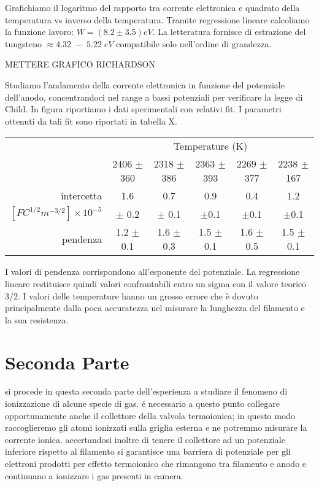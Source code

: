 \documentclass[11pt,a4paper]{article}
\begin{document}
Grafichiamo il logaritmo del rapporto tra corrente elettronica e quadrato della temperatura vs inverso della temperatura. Tramite regressione lineare calcoliamo la funzione lavoro: $W = (8.2 \pm 3.5) eV$. La letteratura fornisce  di estrazione del tungsteno $\approx 4.32 \; - \; 5.22 \; eV$ compatibile solo nell'ordine di grandezza.  

	METTERE GRAFICO RICHARDSON
	
Studiamo l'andamento della corrente elettronica in funzione del potenziale dell'anodo, concentrandoci nel range a bassi potenziali per verificare la legge di Child. In figura riportiamo i dati sperimentali con relativi fit. I parametri ottenuti da tali fit sono riportati in tabella X.

\begin{center}
\begin{tabular}{rccccc}
&\multicolumn{5}{c}{Temperature (K)}\\
&2406 $\pm$ 360& 	2318 $\pm$ 386&	2363 $\pm$ 393 &	2269 $\pm$ 377&	2238 $\pm$ 167\\ \hline
intercetta&	1.6&	0.7&	0.9&	0.4&	1.2\\
$[F C^{1/2} m^{-3/2}] \times 10^{-5}$&	$\pm$ 0.2&	$\pm$ 0.1&	$\pm$0.1&	$\pm$0.1&	$\pm$0.1	  \\ \hline
pendenza&	1.2 $\pm$ 0.1	&	1.6 $\pm$ 0.3&	1.5 $\pm$ 0.1&	1.6 $\pm$ 0.5&	1.5 $\pm$ 0.1\\ \hline \hline
\end{tabular}
\end{center}

I valori di pendenza corrispondono all'esponente del potenziale. La regressione lineare restituisce quindi valori confrontabili entro un sigma con il valore teorico 3/2. I valori delle temperature hanno un grosso errore che è dovuto principalmente dalla poca accuratezza nel misurare la lunghezza del filamento e la sua resistenza.

\section{Seconda Parte}
 
si procede in questa seconda parte dell'esperienza a studiare il fenomeno di ionizzazione di alcune specie di gas. é necessario a questo punto collegare opportunamente anche il collettore della valvola termoionica; in questo modo raccoglieremo gli atomi ionizzati sulla griglia esterna e ne potremmo misurare la corrente ionica. accertandosi inoltre di tenere il collettore ad un potenziale inferiore rispetto al filamento si garantisce una barriera di potenziale per gli elettroni prodotti per effetto termoionico che rimangono tra filamento e anodo e continuano a ionizzare i gas presenti in camera.
\end{document}
